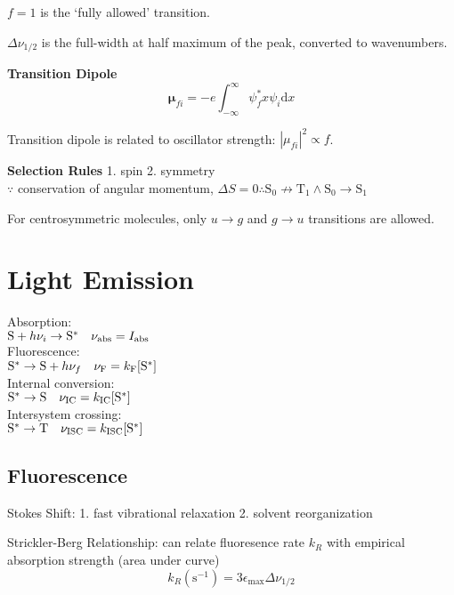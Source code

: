 $f = 1$ is the `fully allowed' transition.

$\Delta \nu_{1/2}$ is the full-width at half maximum of the peak, converted to wavenumbers.
\vspace{\baselineskip}

\textbf{Transition Dipole}
\begin{equation*}
  \mathbf{\mu}_{fi} = -e \int_{-\infty}^{\infty}\psi^{*}_{f} x \psi_{i} \mathrm{d}x
\end{equation*}

Transition dipole is related to oscillator strength: $|\mu_{fi}|^2 \propto f$.
\vspace{\baselineskip}

\textbf{Selection Rules} 1. spin 2. symmetry \\
$\because$ conservation of angular momentum, $\Delta S =0 \therefore \mathrm{S_0} \not\rightarrow \mathrm{T_1} \wedge \mathrm{S_0} \rightarrow \mathrm{S_1}$

For centrosymmetric molecules, only $u \rightarrow g$ and  $g \rightarrow u$ transitions are allowed.
\vspace{\baselineskip}
\section{Light Emission}

Absorption:\\ $\ce{S} + h\nu_i \rightarrow \ce{S}^{*}\quad \nu_{\mathrm{abs}} = I_{\mathrm{abs}}$\\
Fluorescence:\\ $\ce{S}^{*} \rightarrow \ce{S} + h\nu_f \quad \nu_{\mathrm{F}} = k_{\mathrm{F}} [\ce{S}^{*}]$ \\
Internal conversion:\\ $\ce{S}^{*} \rightarrow \ce{S} \quad \nu_{\mathrm{IC}} = k_{\mathrm{IC}}[\ce{S}^{*}]$ \\
Intersystem crossing:\\ $\ce{S}^{*} \rightarrow \ce{T} \quad \nu_{\mathrm{ISC}} = k_{\mathrm{ISC}}[\ce{S}^{*}]$ \\

\subsection*{Fluorescence}
Stokes Shift:
1. fast vibrational relaxation 2. solvent reorganization
\vspace{\baselineskip}

Strickler-Berg Relationship: can relate fluoresence rate $k_R$ with empirical absorption strength (area under curve)
$$ k_R (\mathrm{s}^{-1})= 3 \epsilon_{\mathrm{max}} \Delta \nu_{1/2}$$

